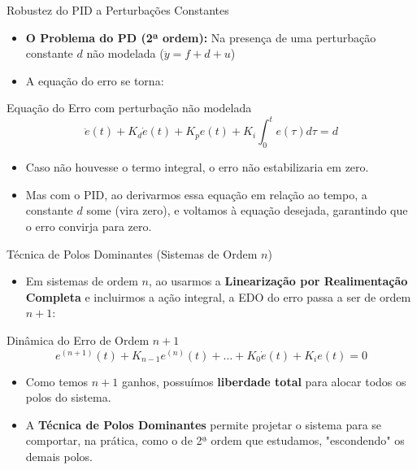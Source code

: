 \documentclass[11pt, aspectratio=169]{beamer}
\begin{document}
\begin{frame}{Robustez do PID a Perturbações Constantes}
    \begin{itemize}
        \item \textbf{O Problema do PD (2ª ordem):} Na presença de uma perturbação constante $d$ não modelada ($\ddot{y} = f + d + u$)
        \item A equação do erro se torna:
    \end{itemize}
    
    \begin{block}{Equação do Erro com perturbação não modelada}
        \[ \ddot{e}(t) + K_d \dot{e}(t) + K_p e(t) + K_i \int_0^t e(\tau) d\tau = d \]
    \end{block}
    
    \begin{itemize}
        \item Caso não houvesse o termo integral, o erro não estabilizaria em zero.
        \item Mas com o PID, ao derivarmos essa equação em relação ao tempo, a constante $d$ some (vira zero), e voltamos à equação desejada, garantindo que o erro convirja para zero.
    \end{itemize}
\end{frame}


\begin{frame}{Técnica de Polos Dominantes (Sistemas de Ordem $n$)}
    \begin{itemize}
        \item Em sistemas de ordem $n$, ao usarmos a \textbf{Linearização por Realimentação Completa} e incluirmos a ação integral, a EDO do erro passa a ser de ordem $n+1$:
    \end{itemize}
    
    \begin{block}{Dinâmica do Erro de Ordem $n+1$}
        \[ e^{(n+1)}(t) + K_{n-1} e^{(n)}(t) + \dots + K_0 \dot{e}(t) + K_i e(t) = 0 \] %
    \end{block}

    \begin{itemize}
        \item Como temos $n+1$ ganhos, possuímos \textbf{liberdade total} para alocar todos os polos do sistema.
        \item A \textbf{Técnica de Polos Dominantes} permite projetar o sistema para se comportar, na prática, como o de 2ª ordem que estudamos, "escondendo" os demais polos.
    \end{itemize}
\end{frame}
\end{document}
